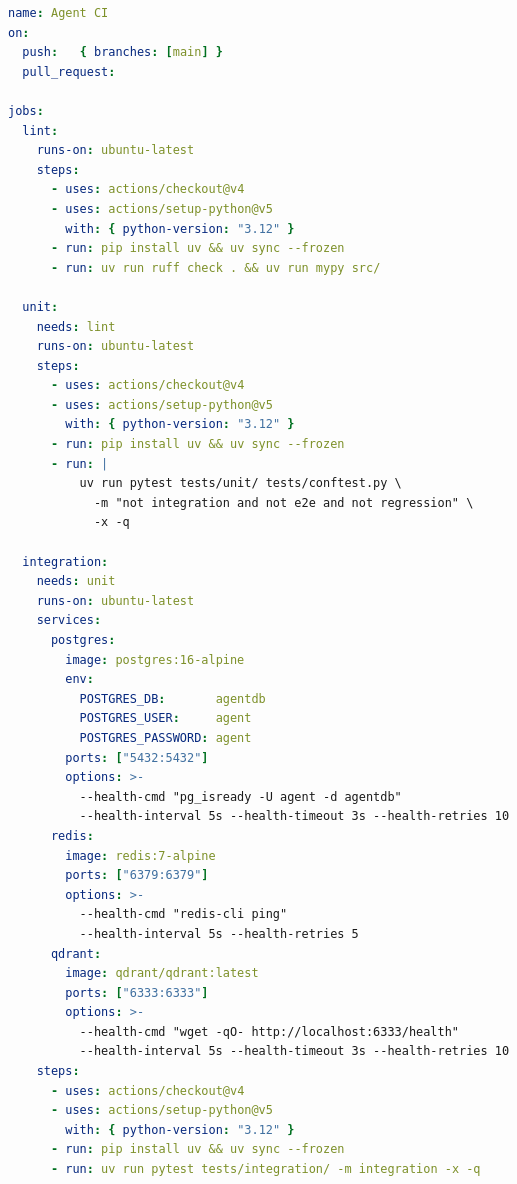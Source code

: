 \begin{lstlisting}[language=yaml, caption={CI pipeline: lint, unit, and
  integration jobs (\texttt{.github/workflows/ci.yml}, Part~1).},
  label={lst:ci-part1}]
name: Agent CI
on:
  push:   { branches: [main] }
  pull_request:

jobs:
  lint:
    runs-on: ubuntu-latest
    steps:
      - uses: actions/checkout@v4
      - uses: actions/setup-python@v5
        with: { python-version: "3.12" }
      - run: pip install uv && uv sync --frozen
      - run: uv run ruff check . && uv run mypy src/

  unit:
    needs: lint
    runs-on: ubuntu-latest
    steps:
      - uses: actions/checkout@v4
      - uses: actions/setup-python@v5
        with: { python-version: "3.12" }
      - run: pip install uv && uv sync --frozen
      - run: |
          uv run pytest tests/unit/ tests/conftest.py \
            -m "not integration and not e2e and not regression" \
            -x -q

  integration:
    needs: unit
    runs-on: ubuntu-latest
    services:
      postgres:
        image: postgres:16-alpine
        env:
          POSTGRES_DB:       agentdb
          POSTGRES_USER:     agent
          POSTGRES_PASSWORD: agent
        ports: ["5432:5432"]
        options: >-
          --health-cmd "pg_isready -U agent -d agentdb"
          --health-interval 5s --health-timeout 3s --health-retries 10
      redis:
        image: redis:7-alpine
        ports: ["6379:6379"]
        options: >-
          --health-cmd "redis-cli ping"
          --health-interval 5s --health-retries 5
      qdrant:
        image: qdrant/qdrant:latest
        ports: ["6333:6333"]
        options: >-
          --health-cmd "wget -qO- http://localhost:6333/health"
          --health-interval 5s --health-timeout 3s --health-retries 10
    steps:
      - uses: actions/checkout@v4
      - uses: actions/setup-python@v5
        with: { python-version: "3.12" }
      - run: pip install uv && uv sync --frozen
      - run: uv run pytest tests/integration/ -m integration -x -q
\end{lstlisting}

